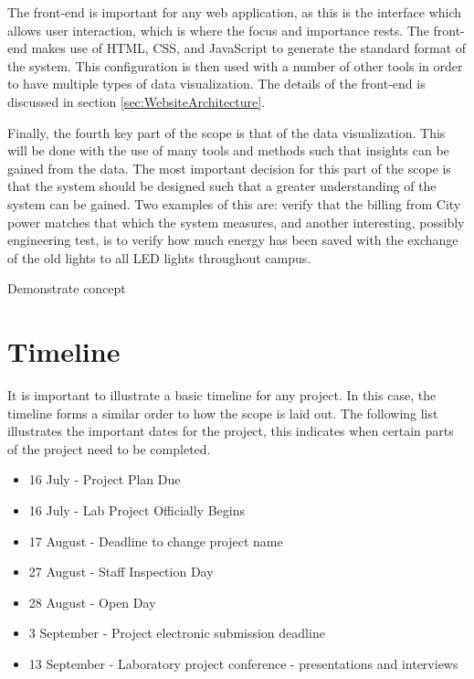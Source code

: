 \documentclass[12pt,onecolumn]{IEEEtran}
\begin{document}
The front-end is important for any web application, as this is the interface which allows user interaction, which is where the focus and importance rests. The front-end makes use of HTML, CSS, and JavaScript to generate the standard format of the system. This configuration is then used with a number of other tools in order to have multiple types of data visualization.
The details of the front-end is discussed in section \ref{sec:WebsiteArchitecture}.

Finally, the fourth key part of the scope is that of the data visualization. This will be done with the use of many tools and methods such that insights can be gained from the data. The most important decision for this part of the scope is that the system should be designed such that a greater understanding of the system can be gained. Two examples of this are: verify that the billing from City power matches that which the system measures, and another interesting, possibly engineering test, is to verify how much energy has been saved with the exchange of the old lights to all LED lights throughout campus. 


Demonstrate concept


\section{Timeline} \label{sec:Timeline}
It is important to illustrate a basic timeline for any project. In this case, the timeline forms a similar order to how the scope is laid out. 
The following list illustrates the important dates for the project, this indicates when certain parts of the project need to be completed. 

\begin{itemize}
    \item 16 July - Project Plan Due
    \item 16 July - Lab Project Officially Begins
    \item 17 August - Deadline to change project name
    \item 27 August - Staff Inspection Day
    \item 28 August - Open Day
    \item 3 September - Project electronic submission deadline
    \item 13 September - Laboratory project conference - presentations and interviews
\end{itemize}
\end{document}
